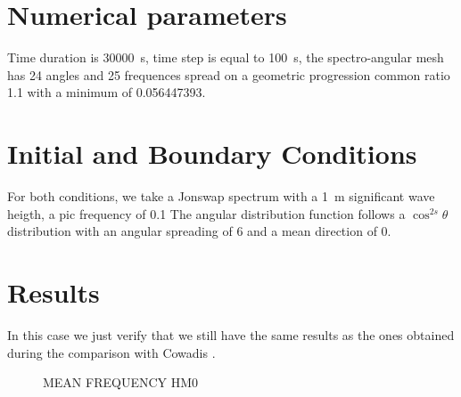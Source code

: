 %
\section{Numerical parameters}
%
Time duration is 30000~s, time step is equal to 100~s, the spectro-angular mesh has 24 angles and 25 frequences spread on a geometric progression common ratio 1.1 with a minimum of 0.056447393.

\section{Initial and Boundary Conditions}
%
For both conditions, we take a Jonswap spectrum with a 1~m significant wave heigth, a pic frequency of 0.1 The angular distribution function follows a $\cos^{2s} \theta$ distribution with an angular spreading of 6 and a mean direction of 0.


%
%
\section{Results}
In this case we just verify that we still have the same results as the ones obtained during the comparison with Cowadis \cite{cowadis}.
\begin{figure} [!h]
\centering
{}
 \caption{MEAN FREQUENCY HM0}\label{resultsbf}
\end{figure}

